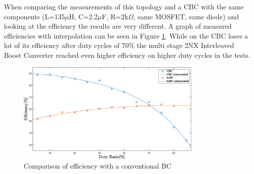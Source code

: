 When comparing the measurements of this topology and a CBC with the same components (L=135$\mu$H, C=2.2$\mu$F, R=2k$\Omega$, same MOSFET, same diode)
and looking at the efficiency the results are very different.
A graph of measured efficiencies with interpolation can be seen in Figure \ref{fig:Efficiencycomparison}.
While on the CBC loses a lot of its efficiency after duty cycles of 70\% the multi stage 2NX Interleaved Boost Converter reached even higher efficiency on higher duty cycles in the tests.

\begin{figure}[H]
	\begin{center}
   \includegraphics[width=0.8\textwidth]{figures/Efficiencycomparison.eps}
	\end{center}
	\vspace{-4mm}
	\caption{Comparison of efficiency with a conventional BC}
	\label{fig:Efficiencycomparison}
\end{figure}